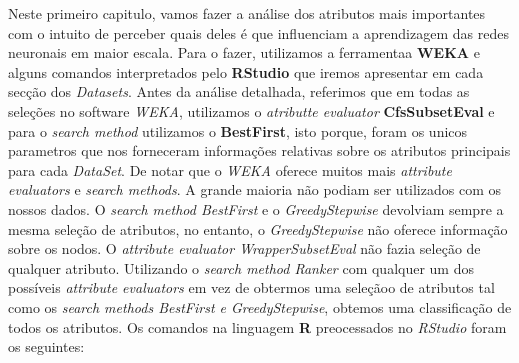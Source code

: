 \documentclass{report}
\begin{document}
Neste primeiro capitulo, vamos fazer a análise dos atributos mais importantes com o intuito de perceber quais deles é que influenciam a aprendizagem das redes neuronais em maior escala. 
Para o fazer, utilizamos a ferramentaa \textbf{WEKA} e alguns comandos interpretados pelo \textbf{RStudio} que iremos apresentar em cada secção dos \textit{Datasets}.
Antes da análise detalhada, referimos que em todas as seleções no software \textit{WEKA}, utilizamos o \textit{atributte evaluator} \textbf{CfsSubsetEval} e para o \textit{search method} utilizamos o \textbf{BestFirst}, isto porque, foram os unicos parametros que nos forneceram informações relativas sobre os atributos principais para cada \textit{DataSet}. 
De notar que o \textit{WEKA} oferece muitos mais \textit{attribute evaluators} e \textit{search methods}. A grande maioria não podiam ser utilizados com os nossos dados. O \textit{search method BestFirst} e o \textit{GreedyStepwise} devolviam sempre a mesma seleção de atributos, no entanto, o \textit{GreedyStepwise} não oferece informação sobre os nodos. O \textit{attribute evaluator WrapperSubsetEval} não fazia seleção de qualquer atributo. Utilizando o \textit{search method Ranker} com qualquer um dos possíveis \textit{attribute evaluators} em vez de obtermos uma seleçãoo de atributos tal como os \textit{search methods BestFirst e GreedyStepwise}, obtemos uma classificação de todos os atributos.
Os comandos na linguagem \textbf{R} preocessados no \textit{RStudio} foram os seguintes:
\end{document}

